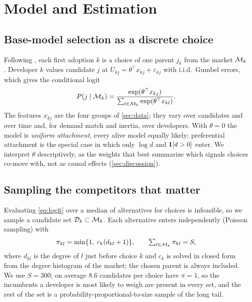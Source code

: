 \section{Model and Estimation}
\label{sec:method}

\subsection{Base-model selection as a discrete choice}
Following \citet{overgoor2019choosing}, each first adoption $k$ is a choice of one parent $j_k$ from the market
$\mathcal{M}_k$. Developer $k$ values candidate $j$ at $U_{kj} = \theta^\top x_{kj} + \varepsilon_{kj}$ with i.i.d.\ Gumbel
errors, which gives the conditional logit \citep{mcfadden1974conditional}
\begin{equation}
  P(j \mid \mathcal{M}_k) = \frac{\exp(\theta^\top x_{kj})}{\sum_{l \in \mathcal{M}_k} \exp(\theta^\top x_{kl})}.
  \label{eq:logit}
\end{equation}
The features $x_{kj}$ are the four groups of \cref{sec:data}; they vary over candidates and over time and, for
demand match and inertia, over developers. With $\theta = 0$ the model is \emph{uniform attachment}, every
alive model equally likely; preferential attachment is the special case in which only $\log d$ and $\mathbf{1}[d>0]$
enter. We interpret $\theta$ descriptively, as the weights that best summarize which signals choices co-move with,
not as causal effects (\cref{sec:discussion}).

\subsection{Sampling the competitors that matter}
\label{sec:sampling}
Evaluating \eqref{eq:logit} over a median of \marketMedian{} alternatives for \nFirst{} choices is infeasible, so we
sample a candidate set $\mathcal{D}_k \subset \mathcal{M}_k$. Each alternative enters independently (Poisson sampling) with
\begin{equation}
  \pi_{kl} = \min\{1,\; c_k (d_{kl} + 1)\}, \qquad \textstyle\sum_{l \in \mathcal{M}_k} \pi_{kl} = S,
  \label{eq:pps}
\end{equation}
where $d_{kl}$ is the degree of $l$ just before choice $k$ and $c_k$ is solved in closed form from the degree
histogram of the market; the chosen parent is always included. We use $S=300$; on average 8.6 candidates per choice
have $\pi=1$, so the incumbents a developer is most likely to weigh are present in every set, and the rest of the
set is a probability-proportional-to-size sample of the long tail.

